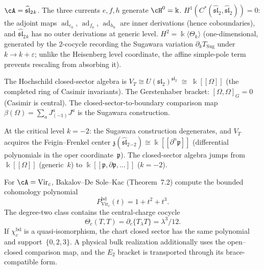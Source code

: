 \begin{computation}
\label{comp:bulk-sl2}
$\cA=\widehat{\mathfrak{sl}}_2{}_k$. The three currents
$e,f,h$ generate $\cH^0=\Bbbk$.
$H^1(C^*(\widehat{\mathfrak{sl}}_2,
\widehat{\mathfrak{sl}}_2))=0$: the adjoint maps
$\operatorname{ad}_{e_0}$,
$\operatorname{ad}_{f_0}$, $\operatorname{ad}_{h_0}$
are inner derivations (hence coboundaries),
and $\widehat{\mathfrak{sl}}_2{}_k$ has no outer
derivations at generic level.
$H^2=\Bbbk\langle\Theta_k\rangle$
(one-dimensional, generated by the $2$-cocycle recording
the Sugawara variation $\partial_k T_{\mathrm{Sug}}$
under $k\to k+\varepsilon$; unlike the Heisenberg level coordinate,
the affine simple-pole term prevents rescaling from absorbing it).

The Hochschild closed-sector algebra is
$V_T\cong U(\mathfrak{sl}_2)^{\mathfrak{sl}_2}
\;\cong\;\Bbbk[[\Omega]]$
(the completed ring of Casimir invariants).
The Gerstenhaber bracket:
$[\Omega,\Omega]_G=0$ (Casimir is central).
The closed-sector-to-boundary comparison map $\beta(\Omega)
=\sum_a J^a_{(-1)}J^a$ is the Sugawara
construction.

At the critical level $k=-2$: the Sugawara construction
degenerates, and $V_T$ acquires the Feigin--Frenkel center
$\mathfrak z(\widehat{\mathfrak{sl}}_2{}_{-2})
\cong\Bbbk[[\partial^n\mathfrak p]]$
(differential polynomials in the oper coordinate~$\mathfrak p$).
The closed-sector algebra jumps from $\Bbbk[[\Omega]]$ (generic~$k$)
to $\Bbbk[[\mathfrak p,\partial\mathfrak p,\dots]]$ ($k=-2$).
\end{computation}

\begin{computation}
\label{comp:bulk-virasoro}
For $\cA=\mathrm{Vir}_c$, Bakalov--De Sole--Kac
\cite{BDSK21} \textup{(}Theorem~7.2\textup{)} compute the bounded cohomology
polynomial
\[
 P^{\mathrm{bd}}_{\mathrm{Vir}_c}(t)=1+t^2+t^3.
\]
The degree-two class contains the central-charge cocycle
\[
 \Theta_c(T,T)=\partial_c\{T_\lambda T\}=\lambda^3/12.
\]
If $\chi_c^{\mathrm{bd}}$ is a quasi-isomorphism, the chart closed
sector has the same polynomial and support~$\{0,2,3\}$.  A physical
bulk realization additionally uses the open--closed comparison map,
and the $E_2$ bracket is transported through its brace-compatible
form.
\end{computation}

